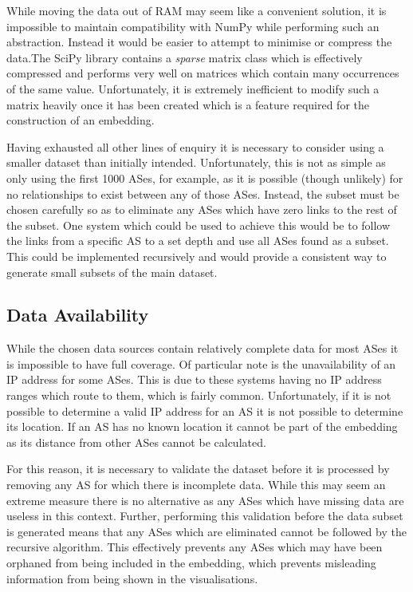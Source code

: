While moving the data out of RAM may seem like a convenient solution, it is impossible to maintain compatibility with NumPy while performing such an abstraction. Instead it would be easier to attempt to minimise or compress the data.The SciPy library contains a \textit{sparse} matrix class which is effectively compressed and performs very well on matrices which contain many occurrences of the same value. Unfortunately, it is extremely inefficient to modify such a matrix heavily once it has been created which is a feature required for the construction of an embedding. 

Having exhausted all other lines of enquiry it is necessary to consider using a smaller dataset than initially intended. Unfortunately, this is not as simple as only using the first 1000 ASes, for example, as it is possible (though unlikely) for no relationships to exist between any of those ASes. Instead, the subset must be chosen carefully so as to eliminate any ASes which have zero links to the rest of the subset. One system which could be used to achieve this would be to follow the links from a specific AS to a set depth and use all ASes found as a subset. This could be implemented recursively and would provide a consistent way to generate small subsets of the main dataset.

\subsection{Data Availability}
While the chosen data sources contain relatively complete data for most ASes it is impossible to have full coverage. Of particular note is the unavailability of an IP address for some ASes. This is due to these systems having no IP address ranges which route to them, which is fairly common. Unfortunately, if it is not possible to determine a valid IP address for an AS it is not possible to determine its location. If an AS has no known location it cannot be part of the embedding as its distance from other ASes cannot be calculated. 

For this reason, it is necessary to validate the dataset before it is processed by removing any AS for which there is incomplete data. While this may seem an extreme measure there is no alternative as any ASes which have missing data are useless in this context. Further, performing this validation before the data subset is generated means that any ASes which are eliminated cannot be followed by the recursive algorithm. This effectively prevents any ASes which may have been orphaned from being included in the embedding, which prevents misleading information from being shown in the visualisations. 

